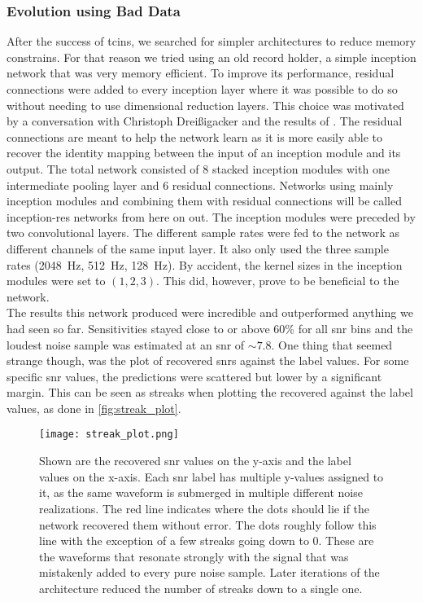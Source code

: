 \subsubsection{Evolution using Bad Data}\label{sec:evolution_bad_data}
After the success of \gls{tcin}s, we searched for simpler architectures to reduce memory constrains. For that reason we tried using an old record holder, a simple inception network that was very memory efficient. To improve its performance, residual connections were added to every inception layer where it was possible to do so without needing to use dimensional reduction layers. This choice was motivated by a conversation with Christoph Dreißigacker and the results of \cite{residual_connections_invention}. The residual connections are meant to help the network learn as it is more easily able to recover the identity mapping between the input of an inception module and its output.
 The total network consisted of 8 stacked inception modules with one intermediate pooling layer and 6 residual connections. Networks using mainly inception modules and combining them with residual connections will be called inception-res networks from here on out. The inception modules were preceded by two convolutional layers. The different sample rates were fed to the network as different channels of the same input layer. It also only used the three sample rates (\SI{2048}{\hertz}, \SI{512}{\hertz}, \SI{128}{\hertz}). By accident, the kernel sizes in the inception modules were set to $(1,2,3)$. This did, however, prove to be beneficial to the network.\\
The results this network produced were incredible and outperformed anything we had seen so far. Sensitivities stayed close to or above 60\% for all \gls{snr} bins and the loudest noise sample was estimated at an \gls{snr} of $\sim 7.8$. One thing that seemed strange though, was the plot of recovered \gls{snr}s against the label values. For some specific \gls{snr} values, the predictions were scattered but lower by a significant margin. This can be seen as streaks when plotting the recovered against the label values, as done in \autoref{fig:streak_plot}.\smallskip\\
\begin{figure}
\centering
\texttt{[image: streak\_plot.png]}
\caption[Plot of recovered values showcasing an error]{Shown are the recovered \gls{snr} values on the y-axis and the label values on the x-axis. Each \gls{snr} label has multiple y-values assigned to it, as the same waveform is submerged in multiple different noise realizations. The red line indicates where the dots should lie if the network recovered them without error. The dots roughly follow this line with the exception of a few streaks going down to 0. These are the waveforms that resonate strongly with the signal that was mistakenly added to every pure noise sample. Later iterations of the architecture reduced the number of streaks down to a single one.}\label{fig:streak_plot}
\end{figure}
